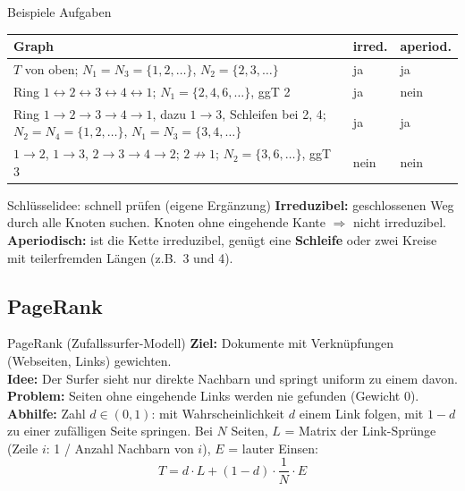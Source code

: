 \documentclass[a4paper, fontsize=7pt]{scrartcl}
\renewcommand*{\arraystretch}{1.5}  %
\begin{document}
\begin{subbox}{Beispiele Aufgaben}
\renewcommand*{\arraystretch}{1.15}
\setlength{\tabcolsep}{3pt}
\begin{tabularx}{\linewidth}{@{}>{\raggedright\arraybackslash}X|l|l@{}}
\textbf{Graph} & \textbf{irred.} & \textbf{aperiod.} \\
\hline
$T$ von oben; $N_1 = N_3 = \{1, 2, \ldots\}$, $N_2 = \{2, 3, \ldots\}$ & ja & ja \\
Ring $1 \leftrightarrow 2 \leftrightarrow 3 \leftrightarrow 4 \leftrightarrow 1$;
$N_1 = \{2, 4, 6, \ldots\}$, ggT 2 & ja & nein \\
Ring $1 \to 2 \to 3 \to 4 \to 1$, dazu $1 \to 3$, Schleifen bei 2, 4;
$N_2 = N_4 = \{1, 2, \ldots\}$, $N_1 = N_3 = \{3, 4, \ldots\}$ & ja & ja \\
$1 \to 2$, $1 \to 3$, $2 \to 3 \to 4 \to 2$; $2 \not\to 1$;
$N_2 = \{3, 6, \ldots\}$, ggT 3 & nein & nein \\
\end{tabularx}
\end{subbox}

\begin{subbox}{Schlüsselidee: schnell prüfen (eigene Ergänzung)}
\textbf{Irreduzibel:} geschlossenen Weg durch alle Knoten suchen. Knoten ohne
eingehende Kante $\Rightarrow$ nicht irreduzibel.\\
\textbf{Aperiodisch:} ist die Kette irreduzibel, genügt eine \textbf{Schleife} oder
zwei Kreise mit teilerfremden Längen (z.B.\ 3 und 4).
\end{subbox}

\subsection{PageRank}

\begin{mainbox}{PageRank (Zufallssurfer-Modell)}
\textbf{Ziel:} Dokumente mit Verknüpfungen (Webseiten, Links) gewichten.\\
\textbf{Idee:} Der Surfer sieht nur direkte Nachbarn und springt uniform zu einem
davon. \textbf{Problem:} Seiten ohne eingehende Links werden nie gefunden (Gewicht 0).\\
\textbf{Abhilfe:} Zahl $d \in (0, 1)$: mit Wahrscheinlichkeit $d$ einem Link folgen,
mit $1 - d$ zu einer zufälligen Seite springen. Bei $N$ Seiten, $L$ = Matrix der
Link-Sprünge (Zeile $i$: 1 / Anzahl Nachbarn von $i$), $E$ = lauter Einsen:
$$\boxed{T = d \cdot L + (1 - d) \cdot \frac{1}{N} \cdot E}$$
\end{mainbox}
\end{document}
